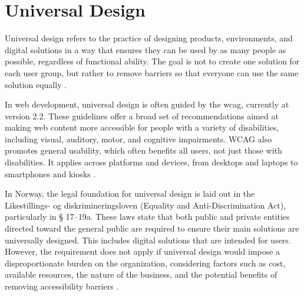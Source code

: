 \section{Universal Design}

Universal design refers to the practice of designing products, environments, and digital solutions in a way that ensures they can be used by as many people as possible, regardless of functional ability. The goal is not to create one solution for each user group, but rather to remove barriers so that everyone can use the same solution equally \cite{uutilsynet}.

In web development, universal design is often guided by the \acrfull{wcag}, currently at version 2.2. These guidelines offer a broad set of recommendations aimed at making web content more accessible for people with a variety of disabilities, including visual, auditory, motor, and cognitive impairments. WCAG also promotes general usability, which often benefits all users, not just those with disabilities. It applies across platforms and devices, from desktops and laptops to smartphones and kiosks \cite{wcag}.

In Norway, the legal foundation for universal design is laid out in the Likestillings- og diskrimineringsloven (Equality and Anti-Discrimination Act), particularly in § 17–19a. These laws state that both public and private entities directed toward the general public are required to ensure their main solutions are universally designed. This includes digital solutions that are intended for users. However, the requirement does not apply if universal design would impose a disproportionate burden on the organization, considering factors such as cost, available resources, the nature of the business, and the potential benefits of removing accessibility barriers \cite{lovdata}.

